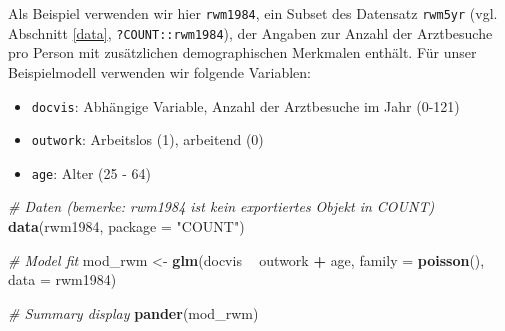\documentclass[ngerman,a4paper,]{scrartcl}
\newenvironment{Shaded}{\begin{snugshade}}{\end{snugshade}}
\newcommand{\CommentTok}[1]{\textcolor[rgb]{0.56,0.35,0.01}{\textit{#1}}}
\newcommand{\DataTypeTok}[1]{\textcolor[rgb]{0.13,0.29,0.53}{#1}}
\newcommand{\KeywordTok}[1]{\textcolor[rgb]{0.13,0.29,0.53}{\textbf{#1}}}
\newcommand{\NormalTok}[1]{#1}
\newcommand{\OperatorTok}[1]{\textcolor[rgb]{0.81,0.36,0.00}{\textbf{#1}}}
\newcommand{\StringTok}[1]{\textcolor[rgb]{0.31,0.60,0.02}{#1}}
\providecommand{\tightlist}{%
  \setlength{\itemsep}{0pt}\setlength{\parskip}{0pt}}
\theoremstyle{definition}
\theoremstyle{definition}
\theoremstyle{definition}
\theoremstyle{remark}
\begin{document}
Als Beispiel verwenden wir hier \texttt{rwm1984}, ein Subset des Datensatz \texttt{rwm5yr} (vgl. Abschnitt \ref{data}, \texttt{?COUNT::rwm1984}), der Angaben zur Anzahl der Arztbesuche pro Person mit zusätzlichen demographischen Merkmalen enthält. Für unser Beispielmodell verwenden wir folgende Variablen:

\begin{itemize}
\tightlist
\item
  \texttt{docvis}: Abhängige Variable, Anzahl der Arztbesuche im Jahr (0-121)
\item
  \texttt{outwork}: Arbeitslos (1), arbeitend (0)
\item
  \texttt{age}: Alter (25 - 64)
\end{itemize}

\begin{Shaded}
\begin{Highlighting}[]
\CommentTok{# Daten (bemerke: rwm1984 ist kein exportiertes Objekt in COUNT)}
\KeywordTok{data}\NormalTok{(rwm1984, }\DataTypeTok{package =} \StringTok{"COUNT"}\NormalTok{)}

\CommentTok{# Model fit}
\NormalTok{mod_rwm <-}\StringTok{ }\KeywordTok{glm}\NormalTok{(docvis }\OperatorTok{~}\StringTok{ }\NormalTok{outwork }\OperatorTok{+}\StringTok{ }\NormalTok{age, }\DataTypeTok{family =} \KeywordTok{poisson}\NormalTok{(), }\DataTypeTok{data =}\NormalTok{ rwm1984)}

\CommentTok{# Summary display}
\KeywordTok{pander}\NormalTok{(mod_rwm)}
\end{Highlighting}
\end{Shaded}
\end{document}
